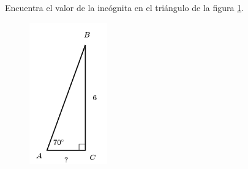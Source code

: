 \question[15]  Encuentra el valor de la incógnita en el triángulo de la figura \ref{fig:lados_functrig_25}.
\begin{figure}[H]
    \begin{center}
        \includegraphics[width=0.3\textwidth]{../images/lados_functrig_25.png}
    \end{center}
    \caption{}
    \label{fig:lados_functrig_25}
\end{figure}